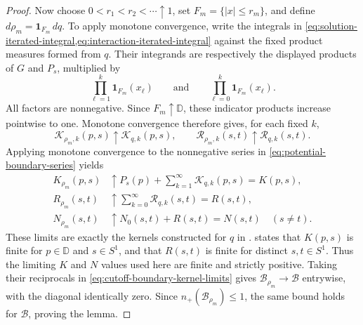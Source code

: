 \begin{proof}
Now choose $0<r_1<r_2<\cdots\uparrow1$, set
$F_m=\{|x|\le r_m\}$, and define $d\rho_m=\mathbf1_{F_m}\,dq$.
To apply monotone convergence, write the integrals in
\cref{eq:solution-iterated-integral,eq:interaction-iterated-integral}
against the fixed product measures formed from $q$. Their
integrands are respectively the displayed products of $G$ and
$P_s$, multiplied by
\[
 \prod_{\ell=1}^k\mathbf1_{F_m}(x_\ell)
 \qquad\text{and}\qquad
 \prod_{\ell=0}^k\mathbf1_{F_m}(x_\ell).
\]
All factors are nonnegative. Since $F_m\uparrow\mathbb D$, these
indicator products increase pointwise to one. Monotone convergence
therefore gives, for each fixed $k$,
\[
 \mathcal K_{\rho_m,k}(p,s)\uparrow\mathcal K_{q,k}(p,s),
 \qquad
 \mathcal R_{\rho_m,k}(s,t)\uparrow\mathcal R_{q,k}(s,t).
\]
Applying monotone convergence to the nonnegative series in
\eqref{eq:potential-boundary-series} yields
\begin{equation}\label{eq:cutoff-boundary-kernel-limits}
 \begin{aligned}
 K_{\rho_m}(p,s)&\uparrow
 P_s(p)+\sum_{k=1}^\infty\mathcal K_{q,k}(p,s)=K(p,s),\\
 R_{\rho_m}(s,t)&\uparrow
 \sum_{k=0}^\infty\mathcal R_{q,k}(s,t)=R(s,t),\\
 N_{\rho_m}(s,t)&\uparrow N_0(s,t)+R(s,t)=N(s,t)\quad(s\ne t).
 \end{aligned}
\end{equation}
These limits are exactly the kernels constructed for $q$ in
.  states that
$K(p,s)$ is finite for $p\in\mathbb D$ and $s\in S^1$, and that
$R(s,t)$ is finite for distinct $s,t\in S^1$. Thus the limiting
$K$ and $N$ values used here are finite and strictly positive.
Taking their reciprocals in \eqref{eq:cutoff-boundary-kernel-limits}
gives $\mathcal B_{\rho_m}\to\mathcal B$ entrywise, with the
diagonal identically zero. Since $n_+(\mathcal B_{\rho_m})\le1$,
the same bound holds for $\mathcal B$, proving the lemma.
\end{proof}

